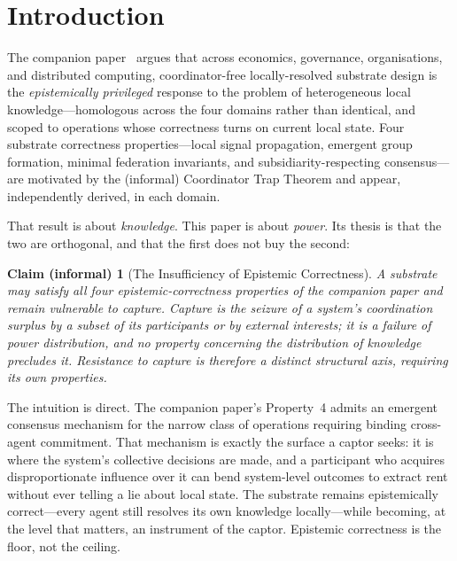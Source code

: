 \documentclass[11pt]{article}
\theoremstyle{definition}
\theoremstyle{plain}
\newtheorem*{informalclaim}{Claim (informal)}
\begin{document}
\section{Introduction}

The companion paper~\cite{nicholson2026hlks} argues that across economics,
governance, organisations, and distributed computing, coordinator-free
locally-resolved substrate design is the \emph{epistemically privileged} response to
the problem of heterogeneous local knowledge---homologous across the four domains
rather than identical, and scoped to operations whose correctness turns on current
local state. Four substrate correctness properties---local signal propagation,
emergent group formation, minimal federation invariants, and subsidiarity-respecting
consensus---are motivated by the (informal) Coordinator Trap Theorem and appear,
independently derived, in each domain.

That result is about \emph{knowledge}. This paper is about \emph{power}. Its thesis
is that the two are orthogonal, and that the first does not buy the second:

\begin{informalclaim}[The Insufficiency of Epistemic Correctness]
A substrate may satisfy all four epistemic-correctness properties of the companion
paper and remain vulnerable to capture. Capture is the seizure of a system's
coordination surplus by a subset of its participants or by external interests;
it is a failure of power distribution, and no property concerning the distribution
of \emph{knowledge} precludes it. Resistance to capture is therefore a distinct
structural axis, requiring its own properties.
\end{informalclaim}

The intuition is direct. The companion paper's Property~4 admits an emergent
consensus mechanism for the narrow class of operations requiring binding
cross-agent commitment. That mechanism is exactly the surface a captor seeks: it
is where the system's collective decisions are made, and a participant who acquires
disproportionate influence over it can bend system-level outcomes to extract rent
without ever telling a lie about local state. The substrate remains epistemically
correct---every agent still resolves its own knowledge locally---while becoming, at
the level that matters, an instrument of the captor. Epistemic correctness is the
floor, not the ceiling.
\end{document}
